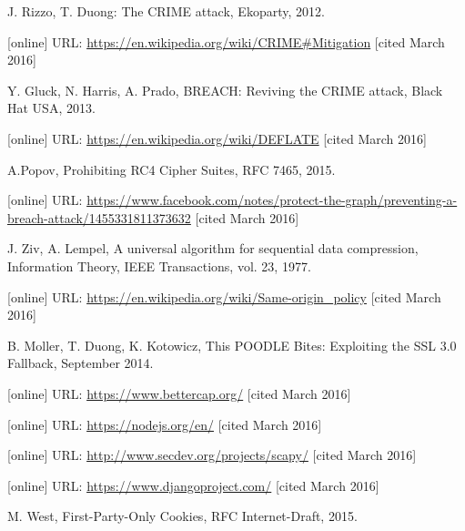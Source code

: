 \documentclass[a4paper, 11 pt, conference]{article}  %
\begin{document}

\begin{thebibliography}{99}

 J. Rizzo, T. Duong: The CRIME attack, Ekoparty, 2012.

 [online] URL: \url{https://en.wikipedia.org/wiki/CRIME#Mitigation} [cited March 2016]

 Y. Gluck, N. Harris, A. Prado, BREACH: Reviving the CRIME attack,
Black Hat USA, 2013.

 [online] URL: \url{https://en.wikipedia.org/wiki/DEFLATE} [cited March 2016]

 A.Popov, Prohibiting RC4 Cipher Suites, RFC 7465, 2015.

 [online] URL: \url{https://www.facebook.com/notes/protect-the-graph/preventing-a-breach-attack/1455331811373632} [cited March 2016]

 J. Ziv, A. Lempel, A universal algorithm for sequential data
compression, Information Theory, IEEE Transactions, vol. 23, 1977.

 [online] URL: \url{https://en.wikipedia.org/wiki/Same-origin_policy} [cited March 2016]

 B. Moller, T. Duong, K. Kotowicz, This POODLE Bites: Exploiting the SSL 3.0 Fallback, September 2014.

 [online] URL: \url{https://www.bettercap.org/} [cited March 2016]

 [online] URL: \url{https://nodejs.org/en/} [cited March 2016]

 [online] URL: \url{http://www.secdev.org/projects/scapy/} [cited March 2016]

 [online] URL: \url{https://www.djangoproject.com/} [cited March 2016]

 M. West, First-Party-Only Cookies, RFC Internet-Draft, 2015.

\end{thebibliography}
\end{document}
